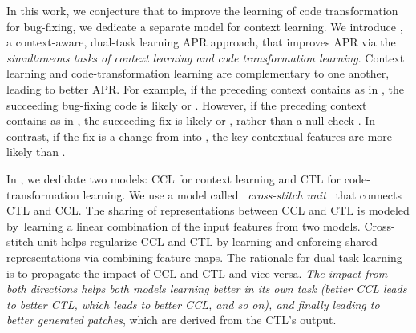 In this work, we conjecture that to improve the learning of code
transformation for bug-fixing, we dedicate a separate model for
context learning. We introduce {\tool}, a context-aware, dual-task
learning APR approach, that improves APR via the {\em simultaneous
  tasks of context learning and code transformation learning}.
Context learning and code-transformation learning are complementary to
one another, leading to better APR. For example, if the
preceding context contains  as in , the succeeding bug-fixing code is likely  \code{!=}  or  \code{==}
. However, if the preceding context contains 
as in  \code{=} , the
succeeding fix is likely  \code{!=}  or
 \code{==} , rather than a null check  \code{!=} . In contrast, if the fix is a change from
 \code{==}  into  \code{!=}
, the key contextual features are more likely
 than .

In {\tool}, we dedidate two models: CCL for context learning and CTL
for code-transformation learning. We use a model called~{\em
  cross-stitch unit}~\cite{misra2016cross} that connects CTL and
CCL. The sharing of representations between CCL and CTL is modeled
by~learning a linear combination of the input features from two
models. Cross-stitch unit helps regularize CCL and CTL by learning and
enforcing shared representations via combining feature maps. The
rationale for dual-task learning is to propagate the impact of CCL and
CTL and vice versa. {\em The impact from both directions helps both
  models learning better in its own task (better CCL leads to better
  CTL, which leads to better CCL, and so on), and finally leading to
  better generated patches}, which are derived from the CTL's output.


